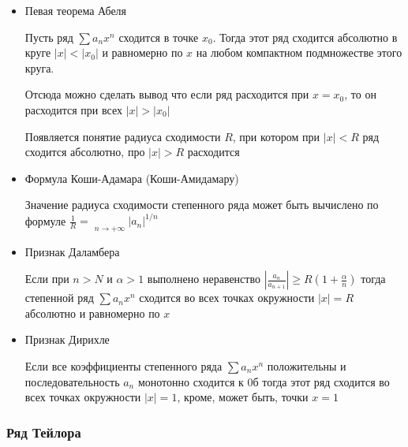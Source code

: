 \documentclass{article}
\DeclareMathOperator*\uplim{\overline{lim}}
\begin{document}
\begin{itemize}
	\item Певая теорема Абеля
	
	Пусть ряд $\sum a_n x^n$ сходится в точке $x_0$. Тогда этот ряд сходится абсолютно в круге $|x| < |x_0|$ и равномерно по $x$ на любом компактном подмножестве этого круга.
	
	Отсюда можно сделать вывод что если ряд расходится при $x = x_0$, то он расходится при всех $|x| > |x_0|$
	
	Появляется понятие радиуса сходимости $R$, при котором при $|x| < R$ ряд сходится абсолютно, про $|x| > R$ расходится
	
	\item Формула Коши-Адамара (Коши-Амидамару)
	
	 Значение радиуса сходимости степенного ряда может быть вычислено по формуле $\frac{1}{R} = \uplim\limits_{n \rightarrow +\infty}|a_n|^{1/n}$
	  
	 \item Признак Даламбера
	 
	 Если при $n > N$ и $\alpha > 1$ выполнено неравенство $|\frac{a_n}{a_{n+1}}| \ge R(1 + \frac{\alpha}{n})$ тогда степенной ряд $\sum a_n x^n$ сходится во всех точках окружности $|x| = R$ абсолютно и равномерно по $x$
	 
	 \item Признак Дирихле
	 
	 Если все коэффициенты степенного ряда $\sum a_n x^n$ положительны и последовательность $a_n$ монотонно сходится к 0б тогда этот ряд сходится во всех точках окружности $|x| = 1$, кроме, может быть, точки $x = 1$
\end{itemize}


\subsubsection{Ряд Тейлора}

\end{document}

